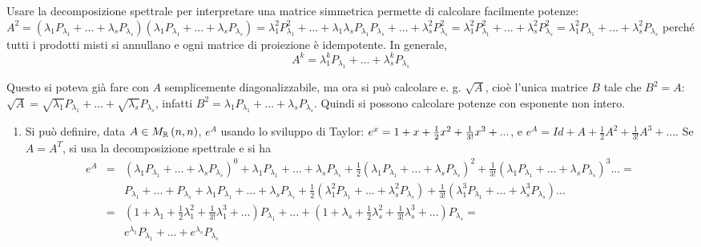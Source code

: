 \documentclass{article}
\begin{document}
Usare la decomposizione spettrale per interpretare una matrice simmetrica
permette di calcolare facilmente potenze: $A^{2}=\left( \lambda
_{1}P_{\lambda _{1}}+...+\lambda _{s}P_{\lambda _{s}}\right) \left( \lambda
_{1}P_{\lambda _{1}}+...+\lambda _{s}P_{\lambda _{s}}\right) =\lambda
_{1}^{2}P_{\lambda _{1}}^{2}+...+\lambda _{1}\lambda _{s}P_{\lambda
_{1}}P_{\lambda _{s}}+...+\lambda _{s}^{2}P_{\lambda _{s}}^{2}=\lambda
_{1}^{2}P_{\lambda _{1}}^{2}+...+\lambda _{s}^{2}P_{\lambda
_{s}}^{2}=\lambda _{1}^{2}P_{\lambda _{1}}+...+\lambda _{s}^{2}P_{\lambda
_{s}}$ perch\'{e} tutti i prodotti misti si annullano e ogni matrice di
proiezione \`{e} idempotente. In generale,%
\begin{equation*}
A^{k}=\lambda _{1}^{k}P_{\lambda _{1}}+...+\lambda _{s}^{k}P_{\lambda _{s}}
\end{equation*}

Questo si poteva gi\`{a} fare con $A$ semplicemente diagonalizzabile, ma ora
si pu\`{o} calcolare e. g. $\sqrt{A}$, cio\`{e} l'unica matrice $B$ tale che 
$B^{2}=A$: $\sqrt{A}=\sqrt{\lambda _{1}}P_{\lambda _{1}}+...+\sqrt{\lambda
_{s}}P_{\lambda _{s}}$, infatti $B^{2}=\lambda _{1}P_{\lambda
_{1}}+...+\lambda _{s}P_{\lambda _{s}}$. Quindi si possono calcolare potenze
con esponente non intero.

\begin{enumerate}
\item Si pu\`{o} definire, data $A\in M_{%
\mathbb{R}
}\left( n,n\right) $, $e^{A}$ usando lo sviluppo di Taylor: $e^{x}=1+x+\frac{%
1}{2}x^{2}+\frac{1}{3!}x^{3}+...$, e $e^{A}=Id+A+\frac{1}{2}A^{2}+\frac{1}{3!%
}A^{3}+...$. Se $A=A^{T}$, si usa la decomposizione spettrale e si ha%
\begin{eqnarray*}
e^{A} &=&\left( \lambda _{1}P_{\lambda _{1}}+...+\lambda _{s}P_{\lambda
_{s}}\right) ^{0}+\lambda _{1}P_{\lambda _{1}}+...+\lambda _{s}P_{\lambda
_{s}}+\frac{1}{2}\left( \lambda _{1}P_{\lambda _{1}}+...+\lambda
_{s}P_{\lambda _{s}}\right) ^{2}+\frac{1}{3!}\left( \lambda _{1}P_{\lambda
_{1}}+...+\lambda _{s}P_{\lambda _{s}}\right) ^{3}...= \\
&&P_{\lambda _{1}}+...+P_{\lambda _{s}}+\lambda _{1}P_{\lambda
_{1}}+...+\lambda _{s}P_{\lambda _{s}}+\frac{1}{2}\left( \lambda
_{1}^{2}P_{\lambda _{1}}+...+\lambda _{s}^{2}P_{\lambda _{s}}\right) +\frac{1%
}{3!}\left( \lambda _{1}^{3}P_{\lambda _{1}}+...+\lambda _{s}^{3}P_{\lambda
_{s}}\right) ... \\
&=&\left( 1+\lambda _{1}+\frac{1}{2}\lambda _{1}^{2}+\frac{1}{3!}\lambda
_{1}^{3}+...\right) P_{\lambda _{1}}+...+\left( 1+\lambda _{s}+\frac{1}{2}%
\lambda _{s}^{2}+\frac{1}{3!}\lambda _{s}^{3}+...\right) P_{\lambda _{s}}= \\
&&e^{\lambda _{1}}P_{\lambda _{1}}+...+e^{\lambda _{s}}P_{\lambda _{s}}
\end{eqnarray*}
\end{enumerate}
\end{document}
